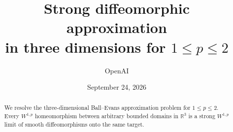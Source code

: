 \documentclass[11pt]{article}
\title{Strong diffeomorphic approximation\\in three dimensions for $1\le p\le2$}
\author{OpenAI}
\date{September 24, 2026}
\numberwithin{equation}{section}
\theoremstyle{definition}
\theoremstyle{remark}
\newcommand{\R}{\mathbb R}
\begin{document}
\maketitle
\begin{abstract}
We resolve the three-dimensional Ball--Evans approximation problem for
$1\le p\le2$. Every $W^{1,p}$ homeomorphism between arbitrary bounded domains
in $\R^3$ is a strong $W^{1,p}$ limit of smooth diffeomorphisms onto the same
target.
\end{abstract}

\tableofcontents




\begingroup
\raggedright


\endgroup
\end{document}
